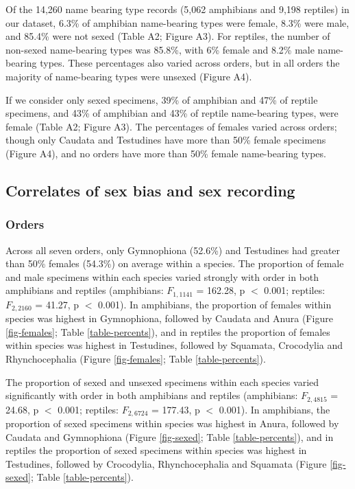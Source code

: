 \documentclass[a4paper, 12pt]{article}
\begin{document}
Of the 14,260 name bearing type records (5,062 amphibians and 9,198 reptiles) in our dataset, 6.3\% of amphibian name-bearing types were female, 8.3\% were male, and 85.4\% were not sexed (Table A2; Figure A3). 
For reptiles, the number of non-sexed name-bearing types was 85.8\%, with 6\% female and 8.2\% male name-bearing types. 
These percentages also varied across orders, but in all orders the majority of name-bearing types were unsexed (Figure A4).

If we consider only sexed specimens, 39\% of amphibian and 47\% of reptile specimens, and 43\% of amphibian and 43\% of reptile name-bearing types, were female (Table A2; Figure A3). 
The percentages of females varied across orders; though only Caudata and Testudines have more than 50\% female specimens (Figure A4), and no orders have more than 50\% female name-bearing types.

\subsection{Correlates of sex bias and sex recording}

\subsubsection{Orders}
Across all seven orders, only Gymnophiona (52.6\%) and Testudines had greater than 50\% females (54.3\%) on average within a species. 
The proportion of female and male specimens within each species varied strongly with order in both amphibians and reptiles (amphibians: $F_{1,1141}$ = 162.28, p $<$ 0.001; reptiles: $F_{2,2160}$ = 41.27, p $<$ 0.001). 
In amphibians, the proportion of females within species was highest in Gymnophiona, followed by Caudata and Anura (Figure \ref{fig-females}; Table \ref{table-percents}), and in reptiles the proportion of females within species was highest in Testudines, followed by Squamata, Crocodylia and Rhynchocephalia (Figure \ref{fig-females}; Table \ref{table-percents}). 

The proportion of sexed and unsexed specimens within each species varied significantly with order in both amphibians and reptiles (amphibians: $F_{2,4815}$ = 24.68, p $<$ 0.001; reptiles: $F_{2,6724}$ = 177.43, p $<$ 0.001). 
In amphibians, the proportion of sexed specimens within species was highest in Anura, followed by Caudata and Gymnophiona (Figure \ref{fig-sexed}; Table \ref{table-percents}), and in reptiles the proportion of sexed specimens within species was highest in Testudines, followed by Crocodylia, Rhynchocephalia and Squamata (Figure \ref{fig-sexed}; Table \ref{table-percents}). 
\end{document}
